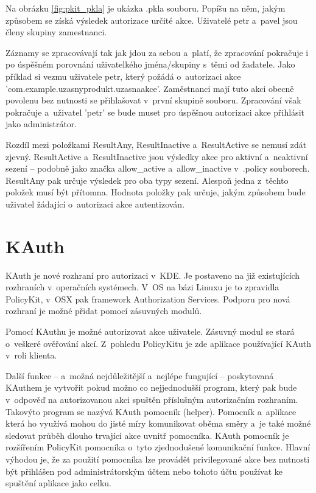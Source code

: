 Na obrázku \ref{fig:pkit_pkla} je ukázka .pkla souboru. Popíšu na něm, jakým
způsobem se získá výsledek autorizace určité akce. Uživatelé petr a~pavel
jsou členy skupiny zamestnanci.

Záznamy se zpracovávají tak jak jdou za sebou a~platí, že zpracování pokračuje
i po úspěšném porovnání uživatelkého jména/skupiny s~těmi od žadatele. Jako
příklad si vezmu uživatele petr, který požádá o~autorizaci akce
'com.example.uzasnyprodukt.uzasnaakce'. Zaměstnanci mají tuto akci obecně
povolenu bez nutnosti se přihlašovat v~první skupině souboru. Zpracování však
pokračuje a~uživatel 'petr' se bude muset pro úspěšnou autorizaci akce přihlásit
jako administrátor.

Rozdíl mezi položkami ResultAny, ResultInactive a~ResultActive se nemusí zdát
zjevný. ResultActive a~ResultInactive jsou výsledky akce pro aktivní a~neaktivní
sezení -- podobně jako značka allow\_active a~allow\_inactive v~.policy
souborech. ResultAny pak určuje výsledek pro oba typy sezení. Alespoň jedna
z~těchto položek musí být přítomna. Hodnota položky pak určuje, jakým způsobem
bude uživatel žádající o~autorizaci akce autentizován.

\section{KAuth}
KAuth je nové rozhraní pro autorizaci v~KDE. Je postaveno na již existujících 
rozhraních v~operačních systémech. V~OS na bázi Linuxu je to zpravidla
PolicyKit, v~OSX pak framework Authorization Services. Podporu pro nová rozhraní
je možné přidat pomocí zásuvných modulů.

Pomocí KAuthu je možné autorizovat akce uživatele. Zásuvný modul se stará
o~veškeré ověřování akcí. Z~pohledu PolicyKitu je zde aplikace používající
KAuth v~roli klienta.

Další funkce -- a~možná nejdůležitější a~nejlépe fungující -- poskytovaná
KAuthem je vytvořit pokud možno co nejjednodušší program, který pak bude
v~odpověď na autorizovanou akci spuštěn příslušným autorizačním rozhraním.
Takovýto program se nazývá KAuth pomocník (helper). Pomocník a~aplikace která
ho využívá mohou do jisté míry komunikovat oběma směry a~je také možné sledovat
průběh dlouho trvající akce uvnitř pomocníka. KAuth pomocník je rozšířením
PolicyKit pomocníka o~tyto zjednodušené komunikační funkce. Hlavní výhodou je,
že za použití pomocníka lze provádět privilegované akce bez nutnosti být
přihlášen pod administrátorským účtem nebo tohoto účtu používat ke spuštění
aplikace jako celku.

